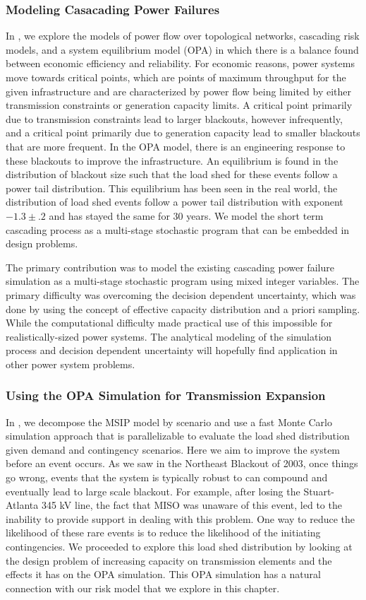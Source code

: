 \subsubsection{Modeling Casacading Power Failures}
In , we explore the models of power flow over topological networks, cascading risk models, and a system equilibrium model (OPA) in which there is a balance found between economic efficiency and reliability.  For economic reasons, power systems move towards critical points, which are points of maximum throughput for the given infrastructure and are characterized by power flow being limited by either transmission constraints or generation capacity limits.  A critical point primarily due to transmission constraints lead to larger blackouts, however infrequently, and a critical point primarily due to generation capacity lead to smaller blackouts that are more frequent.  In the OPA model, there is an engineering response to these blackouts to improve the infrastructure.  An equilibrium is found in the distribution of blackout size such that the load shed for these events follow a power tail distribution.  This equilibrium has been seen in the real world, the distribution of load shed events follow a power tail distribution with exponent $-1.3 \pm .2$ and has stayed the same for 30 years.  We model the short term cascading process as a multi-stage stochastic program that can be embedded in design problems.

The primary contribution was to model the existing cascading power failure simulation as a multi-stage stochastic program using mixed integer variables.  The primary difficulty was overcoming the decision dependent uncertainty, which was done by using the concept of effective capacity distribution and a priori sampling.  While the computational difficulty made practical use of this impossible for realistically-sized power systems.  The analytical modeling of the simulation process and decision dependent uncertainty will hopefully find application in other power system problems.

\subsubsection{Using the OPA Simulation for Transmission Expansion}
In , we decompose the MSIP model by scenario and use a fast Monte Carlo simulation approach that is parallelizable to evaluate the load shed distribution given demand and contingency scenarios.  Here we aim to improve the system before an event occurs.  As we saw in the Northeast Blackout of 2003, once things go wrong, events that the system is typically robust to can compound and eventually lead to large scale blackout.  For example, after losing the Stuart-Atlanta 345 kV line, the fact that MISO was unaware of this event, led to the inability to provide support in dealing with this problem.  One way to reduce the likelihood of these rare events is to reduce the likelihood of the initiating contingencies.  We proceeded to explore this load shed distribution by looking at the design problem of increasing capacity on transmission elements and the effects it has on the OPA simulation.  This OPA simulation has a natural connection with our risk model that we explore in this chapter.

